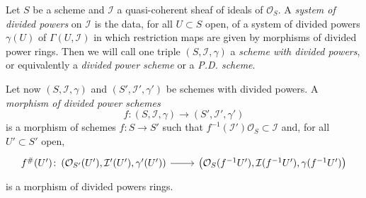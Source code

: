 \begin{defn}\label{defn:DividedPowersSheaf}
	Let $S$ be a scheme and $\mathcal{I}$ a quasi-coherent sheaf
	of ideals of $\mathcal{O}_{ S }$.
	A {\em system of divided powers} on $\mathcal{I}$ is the data,
	for all $U \subset S$ open, of a system of divided powers $\gamma(U)$ 
	of $\Gamma(U,\mathcal{I})$ in which restriction maps
	are given by morphisms of divided power rings.
	Then we will call one triple $\left(S, \mathcal{I}, \gamma\right)$
	a {\em scheme with divided powers}, or equivalently
	a {\em divided power scheme} or a {\em P.D. scheme}.

	Let now $\left(S, \mathcal{I}, \gamma\right)$ and $\left(S', \mathcal{I}', \gamma'\right)$
	be schemes with divided powers.
	A {\em morphism of divided power schemes}
	\begin{equation*}
	f\colon \left(S, \mathcal{I}, \gamma\right) \to 
	\left(S', \mathcal{I}', \gamma'\right)
	\end{equation*}
	is a morphism of schemes
	$f\colon S \to S'$ such that
	$f^{-1}(\mathcal{I}') \mathcal{O}_S \subset \mathcal{I}$
	and, for all $U' \subset S'$ open,
	\begin{equation*}
	\begin{tikzcd}[row sep = 0ex
		,/tikz/column 1/.append style={anchor=base east}
		,/tikz/column 2/.append style={anchor=base west}]
		f^\#(U')\colon 
		\left(\mathcal{O}_{S'}(U'), \mathcal{I}'(U'), \gamma'(U')\right)
		\arrow[r, "", rightarrow] &
		\left(\mathcal{O}_{ S }(f^{-1}U'), \mathcal{I}(f^{-1}U'), \gamma(f^{-1}U')\right)
	\end{tikzcd}
	\end{equation*} 
	is a morphism of divided powers rings.
\end{defn}


